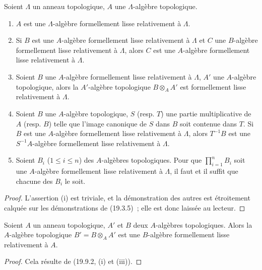 \begin{proposition}[19.9.2]
\label{0.19.9.2-fr}
Soient $\Lambda$ un anneau topologique, $A$ une $\Lambda$-algèbre topologique.
\begin{enumerate}
  \item[\textup{(i)}] $A$ est une $\Lambda$-algèbre formellement lisse relativement à
  $\Lambda$.
  \item[\textup{(ii)}] Si $B$ est une $A$-algèbre formellement lisse relativement à
  $\Lambda$ et $C$ une $B$-algèbre formellement lisse relativement à
  $\Lambda$, alors $C$ est une $A$-algèbre formellement lisse relativement à
  $\Lambda$.
  \item[\textup{(iii)}] Soient $B$ une $A$-algèbre formellement lisse relativement à
  $\Lambda$, $A'$ une $A$-algèbre topologique, alors la $A'$-algèbre
  topologique $B\otimes_A A'$ est formellement lisse relativement à $\Lambda$.
  \item[\textup{(iv)}] Soient $B$ une $A$-algèbre topologique, $S$ \textup{(resp. $T$)} une
  partie multiplicative de $A$ \textup{(resp. $B$)} telle que l'image canonique de $S$
  dans $B$ soit contenue dans $T$. Si $B$ est une $A$-algèbre formellement
  lisse relativement à $\Lambda$, alors $T^{-1}B$ est une $S^{-1}A$-algèbre
  formellement lisse relativement à $\Lambda$.
  \item[\textup{(v)}] Soient $B_i$ ($1\leq i\leq n$) des $A$-algèbres topologiques.
  Pour que $\prod_{i=1}^n B_i$ soit une $A$-algèbre formellement lisse
  relativement à $\Lambda$, il faut et il suffit que chacune des $B_i$ le
  soit.
\end{enumerate}
\end{proposition}

\begin{proof}
L'assertion (i) est triviale, et la démonstration des autres est étroitement
calquée sur les démonstrations de (19.3.5)~; elle est donc laissée au lecteur.
\end{proof}

\begin{corollary}[19.9.3]
\label{0.19.9.3-fr}
Soient $A$ un anneau topologique, $A'$ et $B$ deux $A$-algèbres topologiques.
Alors la $A$-algèbre topologique $B'=B\otimes_A A'$ est une $B$-algèbre
formellement lisse relativement à $A$.
\end{corollary}

\begin{proof}
Cela résulte de (19.9.2, (i) et (iii)).
\end{proof}

